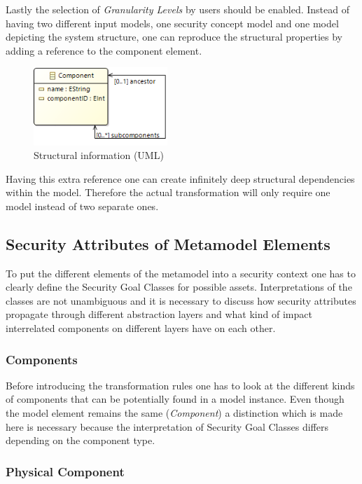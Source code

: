 Lastly the selection of \textit{Granularity Levels} by users should be enabled. Instead of having two different input models, one security concept model and one model depicting the system structure, one can reproduce the structural properties by adding a reference to the component element.      

\begin{figure}[H]
\centering
\includegraphics[width=0.45\textwidth]{pictures/component_structure.png}
\caption{Structural information (UML)}
\label{fig:data}
\end{figure} 

Having this extra reference one can create infinitely deep structural dependencies within the model. Therefore the actual transformation will only require one model instead of two separate ones.

\subsection{Security Attributes of Metamodel Elements }
To put the different elements of the metamodel into a security context one has to clearly define the Security Goal Classes for possible assets. Interpretations of the classes are not unambiguous and it is necessary to discuss how security attributes propagate through different abstraction layers and what kind of impact interrelated components on different layers have on each other. 

\subsubsection{Components}

Before introducing the transformation rules one has to look at the different kinds of components that can be potentially found in a model instance. Even though the model element remains the same (\textit{Component}) a distinction which is made here is necessary because the interpretation of Security Goal Classes differs depending on the component type. 

\subsubsection*{Physical Component}

